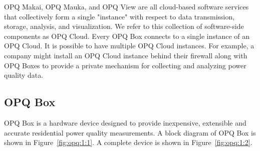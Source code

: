 OPQ Makai, OPQ Mauka, and OPQ View are all cloud-based software services that collectively form a single "instance" with respect to data transmission, storage, analysis, and visualization. We refer to this collection of software-side components as OPQ Cloud. Every OPQ Box connects to a single instance of an OPQ Cloud. It is possible to have multiple OPQ Cloud instances. For example, a company might install an OPQ Cloud instance behind their firewall along with OPQ Boxes to provide a private mechanism for collecting and analyzing power quality data.

\subsection{OPQ Box}
\label{sec:opq-box}

OPQ Box is a hardware device designed to provide inexpensive, extensible and accurate residential power quality measurements.
A block diagram of OPQ Box is shown in Figure~\ref{fig:opq:1:1}.
A complete device is shown in Figure~\ref{fig:opq:1:2}.

